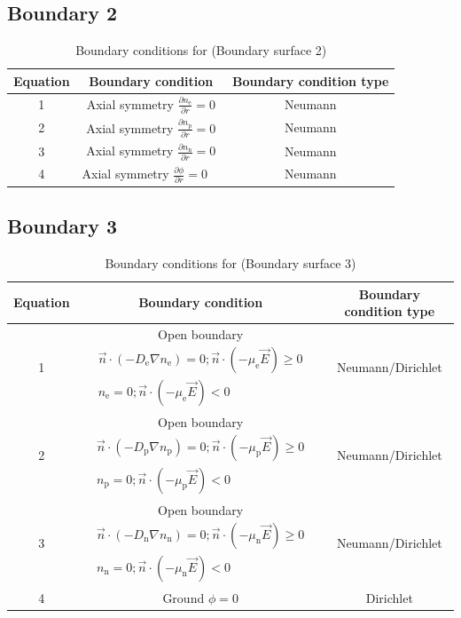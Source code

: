 \documentclass[12pt, a4paper]{report}
\begin{document}
\subsection{Boundary 2}
\begin{table}[!h]
    \centering\begin{tabular}{c|c|c}
        Equation & Boundary condition & Boundary condition type\\ \hline
        1 & Axial symmetry $\frac{\partial n_{\mathrm{e}}}{\partial r}=0$ &  Neumann\\ \hline
        2 & Axial symmetry $\frac{\partial n_{\mathrm{p}}}{\partial r}=0$  & Neumann \\ \hline
        3 & Axial symmetry $\frac{\partial n_{\mathrm{n}}}{\partial r}=0$ & Neumann\\ \hline
        4 & Axial symmetry $\frac{\partial \phi}{\partial r}=0 \quad$ & Neumann \\ \hline

    \end{tabular}
    \caption{Boundary conditions for  (Boundary surface 2)}
\end{table}

\subsection{Boundary 3}

\begin{table}[!h]
    \centering\begin{tabular}{c|c|c}
        Equation & Boundary condition & Boundary condition type\\ \hline
        1 & Open boundary $\begin{array}{c}\vec{n} \cdot\left(-D_{\mathrm{e}} \nabla n_{\mathrm{e}}\right)=0 ; \vec{n} \cdot\left(-\mu_{\mathrm{e}} \vec{E}\right) \geqslant 0 \\ n_{\mathrm{e}}=0 ; \vec{n} \cdot\left(-\mu_{\mathrm{e}} \vec{E}\right)<0\end{array} $ & Neumann/Dirichlet \\ \hline
        2 & Open boundary $\begin{array}{c}\vec{n} \cdot\left(-D_{\mathrm{p}} \nabla n_{\mathrm{p}}\right)=0 ; \vec{n} \cdot\left(-\mu_{\mathrm{p}} \vec{E}\right) \geqslant 0 \\ n_{\mathrm{p}}=0 ; \vec{n} \cdot\left(-\mu_{\mathrm{p}} \vec{E}\right)<0\end{array} $   & Neumann/Dirichlet \\ \hline
        3 & Open boundary $\begin{array}{c}\vec{n} \cdot\left(-D_{\mathrm{n}} \nabla n_{\mathrm{n}}\right)=0 ; \vec{n} \cdot\left(-\mu_{\mathrm{n}} \vec{E}\right) \geqslant 0 \\ n_{\mathrm{n}}=0 ; \vec{n} \cdot\left(-\mu_{\mathrm{n}} \vec{E}\right)<0\end{array} $  & Neumann/Dirichlet\\ \hline
        4 & Ground $\phi=0$ & Dirichlet \\ \hline

    \end{tabular}
    \caption{Boundary conditions for  (Boundary surface 3)}
\end{table}
\end{document}
